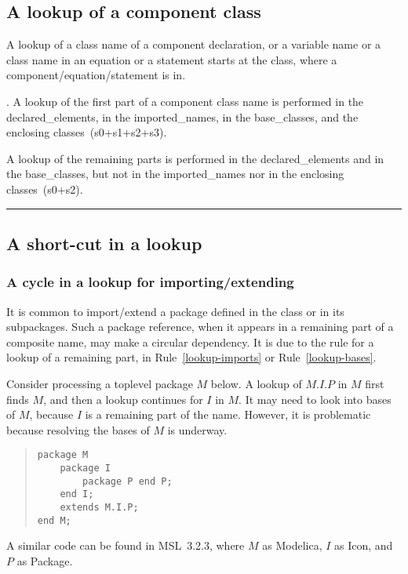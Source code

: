 \documentclass[10pt,b5paper]{article}
\newcounter{ruleno}
\def\tombstone{\rule[-.2ex]{.3em}{1.8ex}}
\newenvironment{widequote}{%
\list{}{\leftmargin=0mm\rightmargin=\leftmargin}%
\item\relax}{\endlist}
\def\rulelead{\refstepcounter{ruleno}{\bf{}Rule~\arabic{ruleno}}.}
\newenvironment{QRULE}{\begin{widequote}\rulelead}%
{\unskip\nobreakspace\tombstone\end{widequote}\ignorespacesafterend}
\begin{document}

\subsection{A lookup of a component class}

A lookup of a class name of a component declaration, or a variable
name or a class name in an equation or a statement starts at the
class, where a component/equation/statement is in.

\begin{QRULE}\label{lookup-components} A lookup of the first part of a
component class name is performed in the declared_elements, in the
imported_names, in the base_classes, and the enclosing
classes~(s0+s1+s2+s3).

A lookup of the remaining parts is performed in the declared_elements
and in the base_classes, but not in the imported_names nor in the
enclosing classes~(s0+s2).
\end{QRULE}


\subsection{A short-cut in a lookup}\label{sec:lookup-cycle}

\subsubsection*{A cycle in a lookup for importing/extending}

It is common to import/extend a package defined in the class or in its
subpackages.  Such a package reference, when it appears in a remaining
part of a composite name, may make a circular dependency.  It is due
to the rule for a lookup of a remaining part, in
Rule~\ref{lookup-imports} or Rule~\ref{lookup-bases}.

Consider processing a toplevel package $M$ below.  A lookup of $M.I.P$
in $M$ first finds $M$, and then a lookup continues for $I$ in $M$.
It may need to look into bases of $M$, because $I$ is a remaining part
of the name.  However, it is problematic because resolving the bases
of $M$ is underway.
\begin{quote}
\begin{lstlisting}[aboveskip=-\baselineskip]
package M
    package I
        package P end P;
    end I;
    extends M.I.P;
end M;
\end{lstlisting}
\end{quote}
A similar code can be found in MSL~3.2.3, where $M$ as Modelica, $I$
as Icon, and $P$ as Package.
\end{document}
